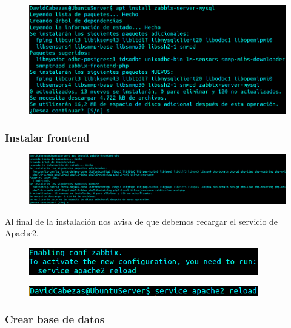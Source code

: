 \documentclass{article}
\begin{document}
\begin{figure}[H]
  \includegraphics[width=160mm]{screenshots/server-MySQL_installation}
\end{figure}


\subsubsection*{Instalar frontend}

\begin{figure}[H]
  \includegraphics[width=160mm]{screenshots/frontend_installation}
\end{figure}

Al final de la instalación nos avisa de que debemos recargar el
servicio de Apache2.

\begin{figure}[H]
  \centering
  \includegraphics[width=100mm]{screenshots/aviso_apache2_reload}
\end{figure}

\begin{figure}[H]
  \centering
  \includegraphics[width=100mm]{screenshots/apache2_reload}
\end{figure}

\subsubsection*{Crear base de datos}
\end{document}
